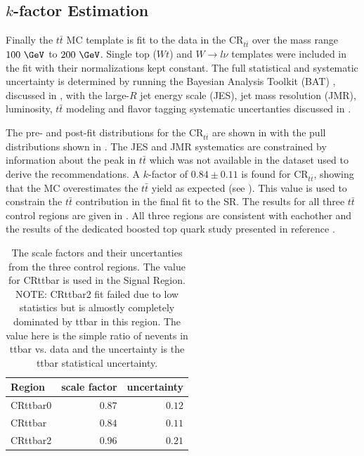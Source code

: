 \subsection{$k$-factor Estimation}

Finally the $t\bar{t}$ MC template is fit to the data in the
$\text{CR}_{t\bar{t}}$ over the mass range $100~\GeV$ to $200~\GeV$.  Single
top ($Wt$) and $W \rightarrow l\nu$ templates were included in the fit with
their normalizations kept constant. The full statistical and systematic
uncertainty is determined by running the Bayesian Analysis Toolkit (BAT)
\cite{Beaujean:2011zz}, discussed in , with the large-$R$ jet
energy scale (JES), jet mass resolution (JMR), luminosity, $t\bar{t}$
modeling and flavor tagging systematic uncertanties discussed in
.

The pre- and post-fit distributions for the $\text{CR}_{t\bar{t}}$ are shown in
 with the pull distributions shown in
.  The JES and JMR systematics are constrained
by information about the peak in $t\bar{t}$ which was not available in the
dataset used to derive the recommendations. A $k$-factor of $0.84 \pm 0.11$ is
found for $\text{CR}_{t\bar{t}}$, showing that the MC overestimates the
$t\bar{t}$ yield as expected (see ). This
value is used to constrain the $t\bar{t}$ contribution in the final fit to the
SR. The results for all three $t\bar{t}$ control regions are given in
.  All three regions are consistent with eachother
and the results of the dedicated boosted top quark study presented in reference
\cite{ATLAS:2016jct}.

\begin{table}
  \centering
  \caption{The \ttbar scale factors and their uncertanties from the three \ttbar
control regions. The value for CRttbar is used in the Signal Region. NOTE:
CRttbar2 fit failed due to low statistics but is almostly completely dominated
by ttbar in this region.  The value here is the simple ratio of nevents in ttbar
vs. data and the uncertainty is the ttbar statistical uncertainty.}
  \begin{tabular}{@{}lrr@{}}
    \toprule
    Region & scale factor & uncertainty \\
    \midrule
    CRttbar0 & $0.87$ & $0.12$ \\
    CRttbar  & $0.84$ & $0.11$ \\
    CRttbar2 & $0.96$ & $0.21$ \\
    \bottomrule
  \end{tabular}
  \label{table:ttbar_kfactors}
\end{table}

